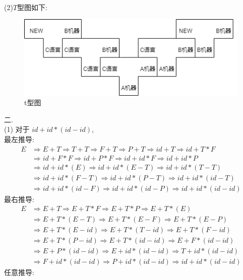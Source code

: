 \documentclass{article}
\begin{document}
\\
(2)$T$型图如下: \\
\begin{figure}[htbp]
    \centering
    \includegraphics[scale=0.6]{t.png}
    \caption{t型图}
\end{figure}
\newpage
二.\\
(1)
对于 $id + id * (id - id)$, \\
最左推导:
\begin{align*}
    E & \Rightarrow E + T \Rightarrow T + T \Rightarrow F + T \Rightarrow P + T \Rightarrow id + T \Rightarrow id + T * F\\
      & \Rightarrow id + F * F \Rightarrow id + P * F \Rightarrow id + id * F  \Rightarrow id + id * P\\
      & \Rightarrow id + id * (E) \Rightarrow id + id * (E - T) \Rightarrow id + id * (T - T)  \\
      & \Rightarrow id + id * (F - T) \Rightarrow id + id * (P - T) \Rightarrow id + id * (id - T)  \\
      & \Rightarrow id + id * (id - F) \Rightarrow id + id * (id - P) \Rightarrow id + id * (id - id)
\end{align*}
最右推导:
\begin{align*}
    E & \Rightarrow E + T \Rightarrow E + T * F \Rightarrow E + T * P \Rightarrow E + T * (E)  \\
      & \Rightarrow E + T * (E - T) \Rightarrow E + T * (E - F) \Rightarrow E + T * (E - P)  \\
      & \Rightarrow E + T * (E - id) \Rightarrow E + T * (T - id) \Rightarrow E + T * (F - id)  \\
      & \Rightarrow E + T * (P - id) \Rightarrow E + T * (id - id) \Rightarrow E + F * (id - id)  \\
      & \Rightarrow E + P * (id - id) \Rightarrow E + id * (id - id) \Rightarrow T + id * (id - id)  \\
      & \Rightarrow F + id * (id - id) \Rightarrow P + id * (id - id) \Rightarrow id + id * (id - id)
\end{align*}
任意推导:
\end{document}
